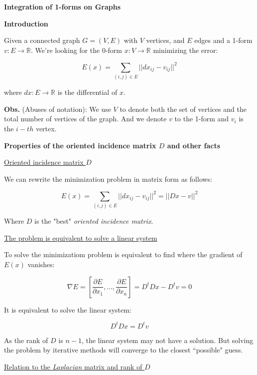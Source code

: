 \documentclass[a4paper,11pt]{article}
\begin{document}
\textbf{Integration of 1-forms on Graphs}

\bigskip

\textbf{Introduction}

\bigskip

Given a connected graph $G=(V,E)$ with $V$ vertices, and $E$ edges and a 
1-form $v: E \rightarrow \mathbb{R}$. We're looking for the 0-form 
$x: V \rightarrow \mathbb{R}$ minimizing the error:

$$E(x) = \sum_{(i,j) \in E} ||dx_{ij} - v_{ij}||^2$$

where $dx: E \rightarrow \mathbb{R}$ is the differential of $x$.

\bigskip


\textbf{Obs.} (Abuses of notation): We use $V$ to denote both the set 
of vertices and the total number of vertices of the graph. And we denote 
$v$ to the 1-form and $v_i$ is the $i-th$ vertex.

\bigskip

\textbf{Properties of the oriented incidence matrix $D$ and other facts}

\bigskip

\underline{Oriented incidence matrix $D$}

\bigskip

We can rewrite the minimization problem in matrix form as follows:

$$E(x) = \sum_{(i,j) \in E} ||dx_{ij} - v_{ij}||^2 = || D x - v||^2$$

Where $D$ is the "best" \emph{oriented incidence matrix}. 

\bigskip

\underline{The problem is equivalent to solve a linear system}

\bigskip

To solve the minimizatiom problem is equivalent to find where the 
gradient of $E(x)$ vanishes:
 
$$\nabla E = [\frac{\partial E}{\partial x_1}, \dots, \frac{\partial 
E}{\partial x_n}] = D^tDx-D^tv=0$$

It is equivalent to solve the linear system:

$$D^tDx = D^tv$$

As the rank of $D$ is $n-1$, the linear system may not have a solution. 
But solving the problem by iterative methods will converge to the 
closest ``possible" guess.

\bigskip

\underline{Relation to the \textit{Laplacian} matrix and rank of $D$}
\end{document}
